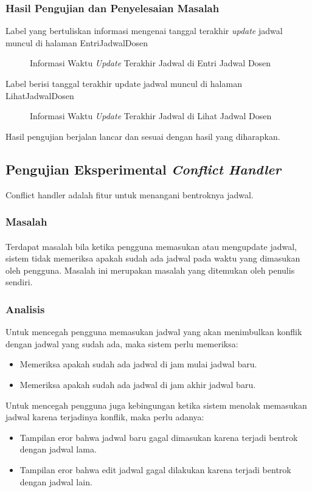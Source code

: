 \subsubsection{Hasil Pengujian dan Penyelesaian Masalah}
Label yang bertuliskan informasi mengenai tanggal terakhir \textit{update} jadwal muncul di halaman EntriJadwalDosen
\begin{figure} [H]
	\centering  
	\caption[Informasi Waktu \textit{Update} Terakhir Jadwal di Entri Jadwal Dosen]{Informasi Waktu \textit{Update} Terakhir Jadwal di Entri Jadwal Dosen}
\end{figure}
Label berisi tanggal terakhir update jadwal muncul di halaman LihatJadwalDosen
\begin{figure} [H]
	\centering  
	\caption[Informasi Waktu \textit{Update} Terakhir Jadwal di Lihat Jadwal Dosen]{Informasi Waktu \textit{Update} Terakhir Jadwal di Lihat Jadwal Dosen}
\end{figure}
Hasil pengujian berjalan lancar dan sesuai dengan hasil yang diharapkan.

\subsection{Pengujian Eksperimental \textit{Conflict Handler}}
Conflict handler adalah fitur untuk menangani bentroknya jadwal.
\subsubsection{Masalah}
\paragraph{}Terdapat masalah bila ketika pengguna memasukan atau mengupdate jadwal, sistem tidak memeriksa apakah sudah ada jadwal pada waktu yang dimasukan oleh pengguna. Masalah ini merupakan masalah yang ditemukan oleh penulis sendiri.
\subsubsection{Analisis}
Untuk mencegah pengguna memasukan jadwal yang akan menimbulkan konflik dengan jadwal yang sudah ada, maka sistem perlu memeriksa:
\begin{itemize}
	\item Memeriksa apakah sudah ada jadwal di jam mulai jadwal baru.
	\item Memeriksa apakah sudah ada jadwal di jam akhir jadwal baru.
\end{itemize}
Untuk mencegah pengguna juga kebingungan ketika sistem menolak memasukan jadwal karena terjadinya konflik, maka perlu adanya:
\begin{itemize}
	\item Tampilan eror bahwa jadwal baru gagal dimasukan karena terjadi bentrok dengan jadwal lama.
	\item Tampilan eror bahwa edit jadwal gagal dilakukan karena terjadi bentrok dengan jadwal lain.
\end{itemize}
